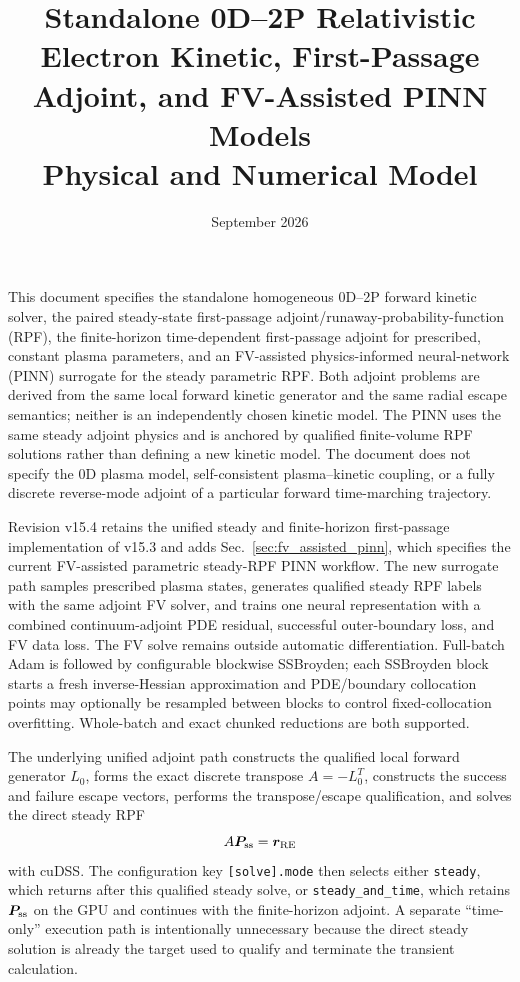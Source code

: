\documentclass[11pt]{article}
\title{Standalone 0D--2P Relativistic Electron Kinetic, First-Passage Adjoint, and FV-Assisted PINN Models\\Physical and Numerical Model}
\author{}
\date{September 2026}
\begin{document}
\maketitle

\noindent
This document specifies the standalone homogeneous 0D--2P forward kinetic solver,
the paired steady-state first-passage adjoint/runaway-probability-function (RPF), the
finite-horizon time-dependent first-passage adjoint for prescribed, constant plasma
parameters, and an FV-assisted physics-informed neural-network (PINN) surrogate for the
steady parametric RPF.  Both adjoint problems are derived from the same local forward
kinetic generator and the same radial escape semantics; neither is an independently
chosen kinetic model.  The PINN uses the same steady adjoint physics and is anchored by
qualified finite-volume RPF solutions rather than defining a new kinetic model.  The
document does not specify the 0D plasma model, self-consistent plasma--kinetic coupling,
or a fully discrete reverse-mode adjoint of a particular forward time-marching
trajectory.

\medskip

\noindent
Revision v15.4 retains the unified steady and finite-horizon first-passage implementation
of v15.3 and adds Sec.~\ref{sec:fv_assisted_pinn}, which specifies the current FV-assisted
parametric steady-RPF PINN workflow.  The new surrogate path samples prescribed plasma
states, generates qualified steady RPF labels with the same adjoint FV solver, and trains
one neural representation with a combined continuum-adjoint PDE residual, successful
outer-boundary loss, and FV data loss.  The FV solve remains outside automatic
differentiation.  Full-batch Adam is followed by configurable blockwise SSBroyden; each
SSBroyden block starts a fresh inverse-Hessian approximation and PDE/boundary collocation
points may optionally be resampled between blocks to control fixed-collocation overfitting.
Whole-batch and exact chunked reductions are both supported.

The underlying unified adjoint path constructs the qualified local
forward generator $L_0$, forms the exact discrete transpose $A=-L_0^T$, constructs the success
and failure escape vectors, performs the transpose/escape qualification, and solves the direct
steady RPF
\begin{equation*}
 A\bm P_{\rm ss}=\bm r_{\rm RE}
\end{equation*}
with cuDSS.  The configuration key \texttt{[solve].mode} then selects either
\texttt{steady}, which returns after this qualified steady solve, or
\texttt{steady\_and\_time}, which retains $\bm P_{\rm ss}$ on the GPU and continues with the
finite-horizon adjoint.  A separate ``time-only'' execution path is intentionally unnecessary
because the direct steady solution is already the target used to qualify and terminate the
transient calculation.
\end{document}
